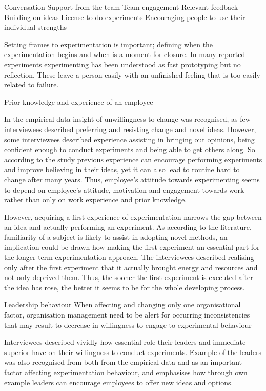 Conversation
Support from the team 
Team engagement
Relevant feedback 
Building on ideas 
License to do experiments
Encouraging people to use their individual strengths  

Setting frames to experimentation is important; defining when the experimentation begins and when is a moment for closure. In many reported experiments experimenting has been understood as fast prototyping but no reflection. These leave a person easily with an unfinished feeling that is too easily related to failure. 

Prior knowledge and experience of an employee \newline

In the empirical data insight of unwillingness to change was recognised, as few interviewees described preferring and resisting change and novel ideas. However, some interviewees described experience assisting in bringing out opinions, being confident enough to conduct experiments and being able to get others along. So according to the study previous experience can encourage performing experiments and improve believing in their ideas, yet it can also lead to routine hard to change after many years. Thus, employee's attitude towards experimenting seems to depend on employee's attitude, motivation and engagement towards work rather than only on work experience and prior knowledge.

However, acquiring a first experience of experimentation narrows the gap between an idea and actually performing an experiment. As according to the literature, familiarity of a subject is likely to assist in adopting novel methods, an implication could be drawn how making the first experiment an essential part for the longer-term experimentation approach. The interviewees described realising only after the first experiment that it actually brought energy and resources and not only deprived them. Thus, the sooner the first experiment is executed after the idea has rose, the better it seems to be for the whole developing process.

Leadership behaviour \newline
When affecting and changing only one organisational factor, organisation management need to be alert for occurring inconsistencies that may result to decrease in willingness to engage to experimental behaviour \citep{lee2004mixed}

Interviewees described vividly how essential role their leaders and immediate superior have on their willingness to conduct experiments. 
Example of the leaders was also recognised from both from the empirical data and as an important factor affecting experimentation behaviour, and \citet{garvin2008yours} emphasises how through own example leaders can encourage employees to offer new ideas and options.

